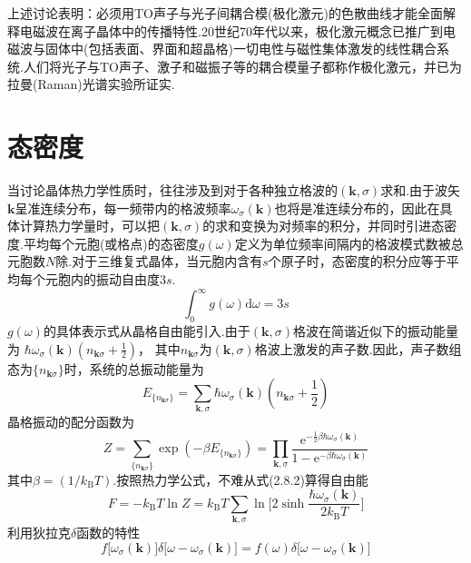 上述讨论表明：必须用TO声子与光子间耦合模(极化激元)的色散曲线才能全面解释电磁波在离子晶体中的传播特性.20世纪70年代以来，极化激元概念已推广到电磁波与固体中(包括表面、界面和超晶格)一切电性与磁性集体激发的线性耦合系统.人们将光子与TO声子、激子和磁振子等的耦合模量子都称作极化激元，并已为拉曼(Raman)光谱实验所证实.

\section{态密度}

当讨论晶体热力学性质时，往往涉及到对于各种独立格波的$(\boldsymbol{k},\sigma)$求和.由于波矢$\boldsymbol{k}$呈准连续分布，每一频带内的格波频率$\omega_{\sigma}(\boldsymbol{k})$也将是准连续分布的，因此在具体计算热力学量时，可以把$(\boldsymbol{k},\sigma)$的求和变换为对频率的积分，并同时引进态密度.平均每个元胞(或格点)的态密度$g(\omega)$定义为单位频率间隔内的格波模式数被总元胞数$N$除.对于三维复式晶体，当元胞内含有$s$个原子时，态密度的积分应等于平均每个元胞内的振动自由度$3s$.
\begin{equation}
  \int_0^{\infty}g(\omega)\mathrm{d}\omega=3s
\end{equation}
$g(\omega)$的具体表示式从晶格自由能引入.由于$(\boldsymbol{k},\sigma)$格波在简谐近似下的振动能量为
$\hbar\omega_{\sigma}(\boldsymbol{k})\left(n_{\boldsymbol{k}\sigma}+\frac{1}{2}\right)$，
其中$n_{\boldsymbol{k}\sigma}$为$(\boldsymbol{k},\sigma)$格波上激发的声子数.因此，声子数组态为$\{n_{\boldsymbol{k}\sigma}\}$时，系统的总振动能量为
\begin{equation*}
  E_{\{n_{\boldsymbol{k}\sigma}\}}
  =\sum_{\boldsymbol{k},\sigma}\hbar\omega_{\sigma}(\boldsymbol{k})
  \left(n_{\boldsymbol{k}\sigma}+\frac{1}{2}\right)
\end{equation*}
晶格振动的配分函数为
\begin{equation}
  Z=\sum_{\{n_{\boldsymbol{k}\sigma}\}}
  \exp(-\beta E_{\{n_{\boldsymbol{k}\sigma}\}})
  =\prod_{\boldsymbol{k},\sigma}
  \frac{\mathrm{e}^{-\frac{1}{2}\beta\hbar\omega_{\sigma}(\boldsymbol{k})}}
  {1-\mathrm{e}^{-\beta\hbar\omega_{\sigma}(\boldsymbol{k})}}
\end{equation}
其中$\beta=(1/k_{\mathrm{B}}T)$.按照热力学公式，不难从式(2.8.2)算得自由能
\begin{equation}
  F=-k_{\mathrm{B}}T\ln Z
  =k_{\mathrm{B}}T\sum_{\boldsymbol{k},\sigma}
  \ln\biggl[2\sinh\frac{\hbar\omega_{\sigma}(\boldsymbol{k})}{2k_{\mathrm{B}}T}\biggr]
\end{equation}
利用狄拉克$\delta$函数的特性
\begin{equation}
  f\bigl[\omega_{\sigma}(\boldsymbol{k})\bigr]
  \delta\bigl[\omega-\omega_{\sigma}(\boldsymbol{k})\bigr]
  =f(\omega)\delta\bigl[\omega-\omega_{\sigma}(\boldsymbol{k})\bigr]
\end{equation}
